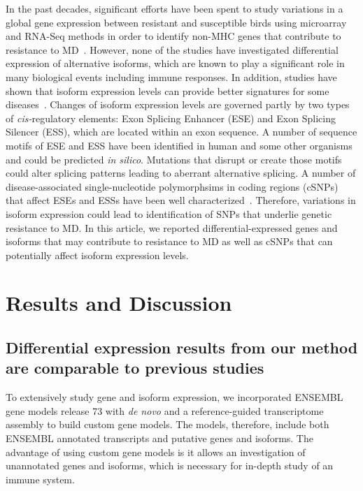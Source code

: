 \documentclass[10pt]{article}
\begin{document}
In the past decades, significant efforts have been spent to study variations in
a global gene expression between resistant and susceptible birds using
microarray and RNA-Seq methods in order to identify non-MHC genes that
contribute to resistance to MD~\cite{}.  However, none of the studies have
investigated differential expression of alternative isoforms, which are known to
play a significant role in many biological events including immune responses.
In addition, studies have shown that isoform expression levels can provide
better signatures for some diseases~\cite{zhang2013isoform}.  Changes of isoform
expression levels are governed partly by two types of {\em cis-}regulatory
elements: Exon Splicing Enhancer (ESE) and Exon Splicing Silencer (ESS), which
are located within an exon sequence.  A number of sequence motifs of ESE and ESS
have been identified in human and some other organisms and could be predicted
{\em in silico}.  Mutations that disrupt or create those motifs could alter
splicing patterns leading to aberrant alternative splicing.  A number of
disease-associated single-nucleotide polymorphsims in coding regions (cSNPs)
that affect ESEs and ESSs have been well characterized~\cite{blencowe2000exonic,
wang2007splicing}.
Therefore, variations in isoform expression could lead to identification of SNPs
that underlie genetic resistance to MD.  In this article, we reported
differential-expressed genes and isoforms that may contribute to resistance to
MD as well as cSNPs that can potentially affect isoform expression levels.


\section*{Results and Discussion}

\subsection*{Differential expression results from our method are comparable to
previous studies}

To extensively study gene and isoform expression, we incorporated ENSEMBL gene
models release 73 with {\em de novo} and a reference-guided transcriptome
assembly to build custom gene models.  The models, therefore, include both
ENSEMBL annotated transcripts and putative genes and isoforms.  The advantage of
using custom gene models is it allows an investigation of unannotated genes and
isoforms, which is necessary for in-depth study of an immune system.
\end{document}
